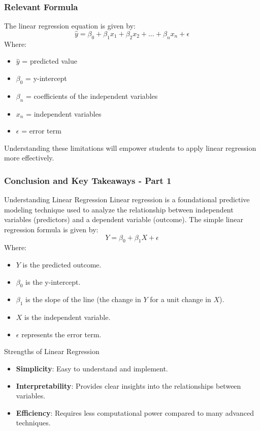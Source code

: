 \documentclass{beamer}
\begin{document}
\begin{frame}[fragile]
    \frametitle{Relevant Formula}
    The linear regression equation is given by:
    \begin{equation}
        \hat{y} = \beta_0 + \beta_1 x_1 + \beta_2 x_2 + \ldots + \beta_n x_n + \epsilon 
    \end{equation}
    Where:  
    \begin{itemize}
        \item $\hat{y}$ = predicted value  
        \item $\beta_0$ = y-intercept  
        \item $\beta_n$ = coefficients of the independent variables  
        \item $x_n$ = independent variables  
        \item $\epsilon$ = error term  
    \end{itemize}

    Understanding these limitations will empower students to apply linear regression more effectively.
\end{frame}

\begin{frame}[fragile]
    \frametitle{Conclusion and Key Takeaways - Part 1}
    \begin{block}{Understanding Linear Regression}
        Linear regression is a foundational predictive modeling technique used to analyze the relationship between independent variables (predictors) and a dependent variable (outcome).
        The simple linear regression formula is given by:  
        \begin{equation}
            Y = \beta_0 + \beta_1X + \epsilon
        \end{equation}
        Where:
        \begin{itemize}
            \item $Y$ is the predicted outcome.
            \item $\beta_0$ is the y-intercept.
            \item $\beta_1$ is the slope of the line (the change in $Y$ for a unit change in $X$).
            \item $X$ is the independent variable.
            \item $\epsilon$ represents the error term.
        \end{itemize}
    \end{block}
    
    \begin{block}{Strengths of Linear Regression}
        \begin{itemize}
            \item \textbf{Simplicity}: Easy to understand and implement.
            \item \textbf{Interpretability}: Provides clear insights into the relationships between variables.
            \item \textbf{Efficiency}: Requires less computational power compared to many advanced techniques.
        \end{itemize}
    \end{block}
\end{frame}
\end{document}
